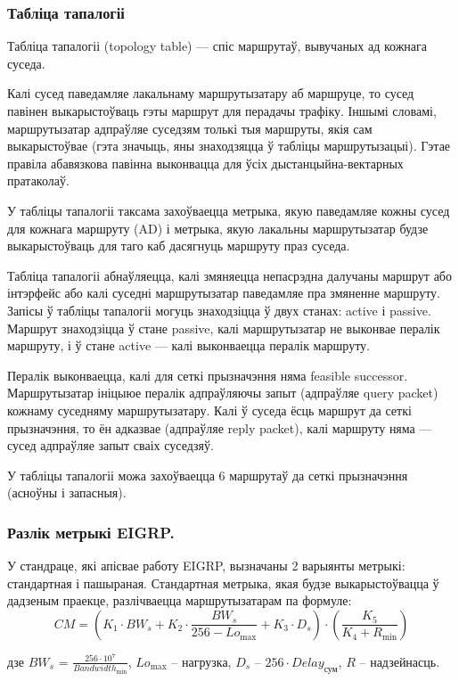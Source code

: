 \subsubsection{Табліца тапалогіі}

Табліца тапалогіі (topology table) --- спіс маршрутаў, вывучаных ад кожнага суседа.

Калі сусед паведамляе лакальнаму маршрутызатару аб маршруце, то сусед павінен выкарыстоўваць гэты маршрут для перадачы трафіку. Іншымі словамі, маршрутызатар адпраўляе суседзям толькі тыя маршруты, якія сам выкарыстоўвае (гэта значыць, яны знаходзяцца ў табліцы маршрутызацыі).
Гэтае правіла абавязкова павінна выконвацца для ўсіх дыстанцыйна-вектарных пратаколаў.

У табліцы тапалогіі таксама захоўваецца метрыка, якую паведамляе кожны сусед для кожнага маршруту (AD) і метрыка, якую лакальны маршрутызатар будзе выкарыстоўваць для таго каб дасягнуць маршруту праз суседа.

Табліца тапалогіі абнаўляецца, калі змяняецца непасрэдна далучаны маршрут або інтэрфейс або калі суседні маршрутызатар паведамляе пра змяненне маршруту.
Запісы ў табліцы тапалогіі могуць знаходзіцца ў двух станах: active і passive.
Маршрут знаходзіцца ў стане passive, калі маршрутызатар не выконвае пералік маршруту, і ў стане active --- калі выконваецца пералік маршруту.

Пералік выконваецца, калі для сеткі прызначэння няма feasible successor. Маршрутызатар ініцыюе пералік адпраўляючы запыт (адпраўляе query packet) кожнаму суседняму маршрутызатару. Калі ў суседа ёсць маршрут да сеткі прызначэння, то ён адказвае (адпраўляе reply packet), калі маршруту няма --- сусед адпраўляе запыт сваіх суседзяў.

У табліцы тапалогіі можа захоўваецца 6 маршрутаў да сеткі прызначэння (асноўны і запасныя).

\subsubsection{Разлік метрыкі EIGRP.}

У стандраце, які апісвае работу EIGRP, вызначаны 2 варыянты метрыкі:
стандартная і пашыраная. Стандартная метрыка, якая будзе выкарыстоўвацца ў дадзеным праекце, разлічваецца маршрутызатарам
па формуле:
\begin{equation}
    CM = \left(K_1 \cdot BW_s + K_2 \cdot \frac{BW_s}{256 -Lo_\text{max}} + K_3 \cdot D_s\right) \cdot \left(\frac{K_5}{K_4 + R_\text{min}}\right)
\end{equation}
\begin{Explanation}
    \item[дзе] $BW_s$ = $\frac{256 \cdot 10^7}{Bandwidth_\text{min}}$,
    $Lo_\text{max}$ -- нагрузка,
    $D_s$ -- $256 \cdot Delay_\text{сум}$,
    $R$ -- надзейнасць.
\end{Explanation}

